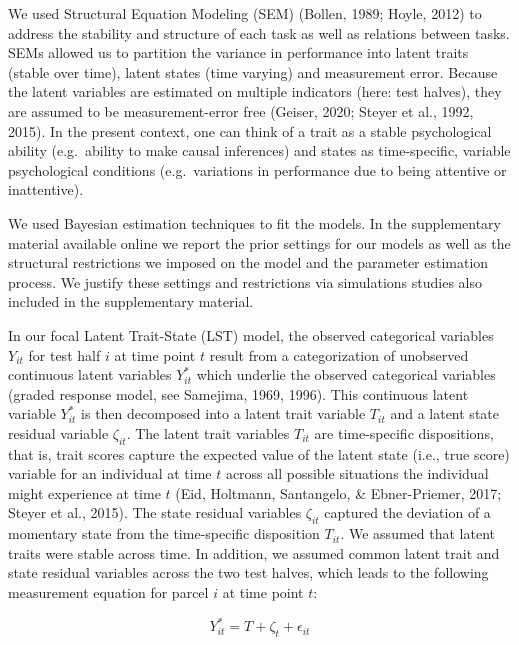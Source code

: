 \documentclass[
  man,floatsintext]{apa6}
\begin{document}
We used Structural Equation Modeling (SEM) (Bollen, 1989; Hoyle, 2012) to address the stability and structure of each task as well as relations between tasks. SEMs allowed us to partition the variance in performance into latent traits (stable over time), latent states (time varying) and measurement error. Because the latent variables are estimated on multiple indicators (here: test halves), they are assumed to be measurement-error free (Geiser, 2020; Steyer et al., 1992, 2015). In the present context, one can think of a trait as a stable psychological ability (e.g.~ability to make causal inferences) and states as time-specific, variable psychological conditions (e.g.~variations in performance due to being attentive or inattentive).

We used Bayesian estimation techniques to fit the models. In the supplementary material available online we report the prior settings for our models as well as the structural restrictions we imposed on the model and the parameter estimation process. We justify these settings and restrictions via simulations studies also included in the supplementary material.

In our focal Latent Trait-State (LST) model, the observed categorical variables \(Y_{it}\) for test half \(i\) at time point \(t\) result from a categorization of unobserved continuous latent variables \(Y^*_{it}\) which underlie the observed categorical variables (graded response model, see Samejima, 1969, 1996). This continuous latent variable \(Y^*_{it}\) is then decomposed into a latent trait variable \(T_{it}\) and a latent state residual variable \(\zeta_{it}\). The latent trait variables \(T_{it}\) are time-specific dispositions, that is, trait scores capture the expected value of the latent state (i.e., true score) variable for an individual at time \(t\) across all possible situations the individual might experience at time \(t\) (Eid, Holtmann, Santangelo, \& Ebner-Priemer, 2017; Steyer et al., 2015). The state residual variables \(\zeta_{it}\) captured the deviation of a momentary state from the time-specific disposition \(T_{it}\). We assumed that latent traits were stable across time. In addition, we assumed common latent trait and state residual variables across the two test halves, which leads to the following measurement equation for parcel \(i\) at time point \(t\):

\begin{equation}
Y^*_{it}= T + \zeta_t + \epsilon_{it}
\end{equation}
\end{document}
